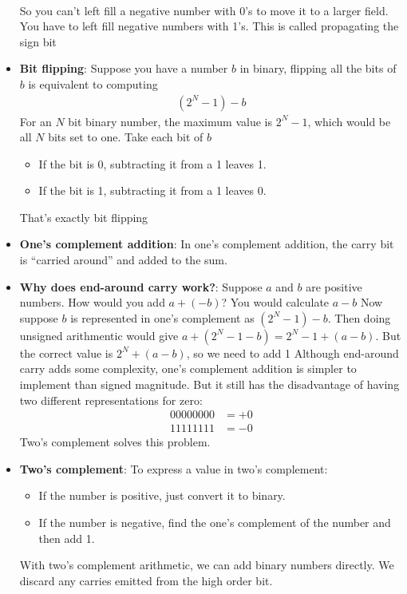 \documentclass{report}
\begin{document}
\begin{itemize}
\begin{align*}
            \end{align*}
            So you can’t left fill a negative number with 0’s to move it to a larger field. You have to left fill negative numbers with 1’s. This is called propagating the sign bit
        \item \textbf{Bit flipping}: Suppose you have a number $b$ in binary, flipping all the bits of $b$ is equivalent to computing
            \begin{align*}
                (2^{N} - 1) - b
            \end{align*}
            \bigbreak \noindent 
            For an $N$ bit binary number, the maximum value is $2^{N}-1$, which would be all $N$ bits set to one. Take each bit of $b$
            \begin{itemize}
                \item If the bit is 0, subtracting it from a 1 leaves 1.
                \item If the bit is 1, subtracting it from a 1 leaves 0.
            \end{itemize}
            That's exactly bit flipping
        \item \textbf{One's complement addition}:  In one’s complement addition, the carry bit is “carried around” and added to the sum.
            \bigbreak \noindent 
        \item \textbf{Why does end-around carry work?}: 
            Suppose $a$ and $b$ are positive numbers. How would you add $a + (-b)$? You would calculate $a-b$
            \bigbreak \noindent 
            Now suppose $b $ is represented in one’s complement as $(2^{N}-1) - b$.
            \bigbreak \noindent 
            Then doing unsigned arithmentic would give $a + (2^{N}-1 - b) = 2^{N}-1 + (a-b)$.
            \bigbreak \noindent 
            But the correct value is $2^{N} + (a-b)$, so we need to add 1
            \bigbreak \noindent 
            Although end-around carry adds some complexity, one’s complement addition is simpler to implement than signed magnitude.
            \bigbreak \noindent 
            But it still has the disadvantage of having two different representations for zero:
            \begin{align*}
                0000 0000 &= +0 \\
                1111 1111 &= -0
            \end{align*}
            Two’s complement solves this problem.
        \item \textbf{Two's complement}: To express a value in two’s complement:
            \begin{itemize}
                \item If the number is positive, just convert it to binary.
                \item If the number is negative, find the one’s complement of the number and then add 1.
            \end{itemize}
            With two’s complement arithmetic, we can add binary numbers directly. We discard any carries emitted from the high order bit.
    \end{itemize}
\end{document}
